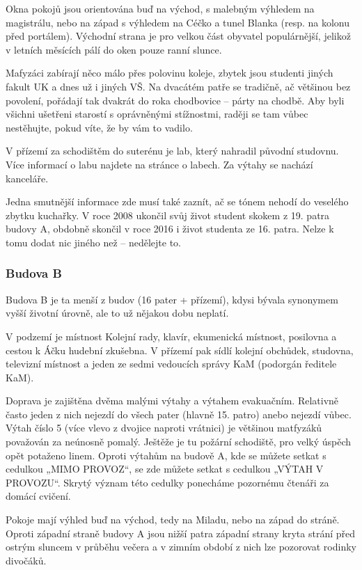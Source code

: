 Okna pokojů jsou orientována buď na východ, s malebným výhledem na magistrálu,
nebo na západ s výhledem na Céčko a tunel Blanka (resp. na kolonu před
portálem). Východní strana je pro velkou část obyvatel populárnější, jelikož v
letních měsících pálí do oken pouze ranní slunce.

Mafyzáci zabírají něco málo přes polovinu koleje, zbytek jsou studenti jiných
fakult UK a dnes už i jiných VŠ. Na dvacátém patře se tradičně, ač většinou bez
povolení, pořádají tak dvakrát do roka chodbovice – párty na chodbě. Aby byli
všichni ušetřeni starostí s oprávněnými stížnostmi, raději se tam vůbec
nestěhujte, pokud víte, že by vám to vadilo.

V přízemí za schodištěm do suterénu je lab, který nahradil původní studovnu.
Více informací o labu najdete na stránce o labech. Za výtahy se nachází
kanceláře.

Jedna smutnější informace zde musí také zaznít, ač se tónem nehodí do veselého
zbytku kuchařky. V roce 2008 ukončil svůj život student skokem z 19. patra
budovy A, obdobně skončil v roce 2016 i život studenta ze 16. patra. Nelze k
tomu dodat nic jiného než – nedělejte to.


\subsubsection{Budova B}
Budova B je ta menší z budov (16 pater + přízemí), kdysi bývala synonymem vyšší
životní úrovně, ale to už nějakou dobu neplatí.

V podzemí je místnost Kolejní rady, klavír, ekumenická místnost, posilovna a
cestou k Áčku hudební zkušebna. V přízemí pak sídlí kolejní obchůdek, studovna,
televizní místnost a jeden ze sedmi vedoucích správy KaM (podorgán ředitele
KaM).

Doprava je zajištěna dvěma malými výtahy a výtahem evakuačním. Relativně často
jeden z nich nejezdí do všech pater (hlavně 15. patro) anebo nejezdí vůbec.
Výtah číslo 5 (více vlevo z dvojice naproti vrátnici) je většinou matfyzáků
považován za neúnosně pomalý. Ještěže je tu požární schodiště, pro velký úspěch
opět potaženo linem. Oproti výtahům na budově A, kde se můžete setkat s cedulkou
„MIMO PROVOZ“, se zde můžete setkat s cedulkou „VÝTAH V PROVOZU“. Skrytý význam
této cedulky ponecháme pozornému čtenáři za domácí cvičení.

Pokoje mají výhled buď na východ, tedy na Miladu, nebo na západ do stráně.
Oproti západní straně budovy A jsou nižší patra západní strany kryta strání před
ostrým sluncem v průběhu večera a v zimním období z nich lze pozorovat rodinky
divočáků.


